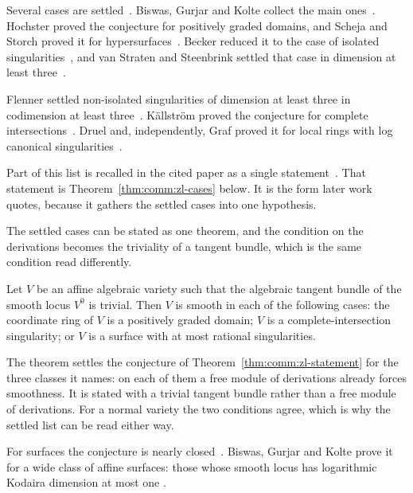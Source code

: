 Several cases are settled~\cite[p.~270]{BiswasGurjarKolte2014}. Biswas, Gurjar
and Kolte collect the main
ones~\cite[p.~270]{BiswasGurjarKolte2014}. Hochster proved the conjecture for
positively graded domains, and Scheja and Storch proved it for
hypersurfaces~\cite[p.~270]{BiswasGurjarKolte2014}. Becker reduced it to the
case of isolated singularities~\cite[p.~270]{BiswasGurjarKolte2014}, and van
Straten and Steenbrink settled that case in dimension at least
three~\cite[p.~270]{BiswasGurjarKolte2014}.

Flenner settled non-isolated singularities of dimension at least three in
codimension at least three~\cite[p.~270]{BiswasGurjarKolte2014}. Källström
proved the conjecture for complete
intersections~\cite[p.~270]{BiswasGurjarKolte2014}. Druel and, independently,
Graf proved it for local rings with log canonical
singularities~\cite[p.~270]{BiswasGurjarKolte2014}.

Part of this list is recalled in the cited paper as a single
statement~\cite[Theorem~2.2, pp.~272--273]{BiswasGurjarKolte2014}. That
statement is Theorem~\ref{thm:comm:zl-cases} below. It is the form later work
quotes, because it gathers the settled cases into one hypothesis.

The settled cases can be stated as one theorem, and the condition on the
derivations becomes the triviality of a tangent bundle, which is the same
condition read differently.\begin{theorem}\label{thm:comm:zl-cases}
Let $V$ be an affine algebraic variety such that the algebraic tangent
bundle of the smooth locus $V^0$ is trivial. Then $V$ is smooth in each of
the following cases: the coordinate ring of $V$ is a positively graded
domain; $V$ is a complete-intersection singularity; or $V$ is a surface with
at most rational singularities.
\end{theorem}

The theorem settles the conjecture of
Theorem~\ref{thm:comm:zl-statement} for the three classes it names: on each of
them a free module of derivations already forces smoothness. It is stated with
a trivial tangent bundle rather than a free module of derivations. For a
normal variety the two conditions agree, which is why the settled list can be
read either way.

For surfaces the conjecture is nearly closed~\cite[Theorem~1.2, p.~271]{BiswasGurjarKolte2014}. Biswas, Gurjar and Kolte prove
it for a wide class of affine surfaces: those whose smooth locus has
logarithmic Kodaira dimension at most one
\cite[Theorem~1.2, p.~271]{BiswasGurjarKolte2014}.

